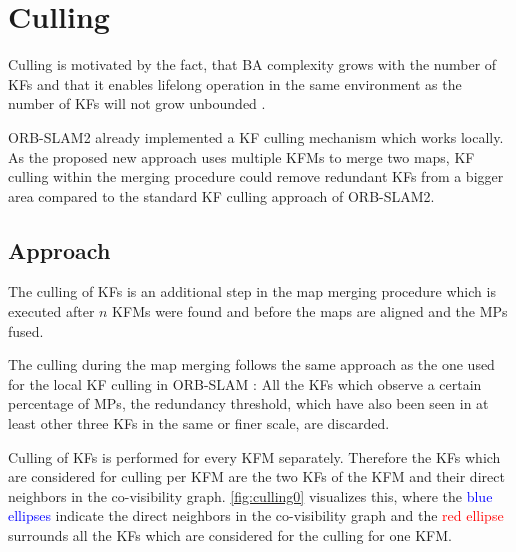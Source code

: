 \chapter{Culling}
\label{sec:culling}

Culling is motivated by the fact, that \ac{BA} complexity grows with the number of \acp{KF} and that it enables lifelong operation in the same environment as the number of \acp{KF} will not grow unbounded \cite{Mur-Artal2015}.

ORB-SLAM2 \cite{Mur-Artal2016} already implemented a \ac{KF} culling mechanism which works locally. As the proposed new approach uses multiple \acp{KFM} to merge two maps, \ac{KF} culling within the merging procedure could remove redundant \acp{KF} from a bigger area compared to the standard \ac{KF} culling approach of ORB-SLAM2.

\section{Approach}

The culling of \acp{KF} is an additional step in the map merging procedure which is executed after $n$ \acp{KFM} were found and before the maps are aligned and the \acp{MP} fused.

The culling during the map merging follows the same approach as the one used for the local \ac{KF} culling in ORB-SLAM \cite{Mur-Artal2015}: All the \acp{KF} which observe a certain percentage of \acp{MP}, the redundancy threshold, which have also been seen in at least other three \acp{KF} in the same or finer scale, are discarded.

Culling of \acp{KF} is performed for every \ac{KFM} separately. Therefore the \acp{KF} which are considered for culling per \ac{KFM} are the two \acp{KF} of the \ac{KFM} and their direct neighbors in the co-visibility graph. \autoref{fig:culling0} visualizes this, where the \textcolor{blue}{blue ellipses} indicate the direct neighbors in the co-visibility graph and the \textcolor{red}{red ellipse} surrounds all the \acp{KF} which are considered for the culling for one \ac{KFM}.


